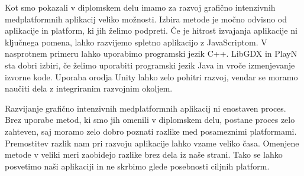 Kot smo pokazali v diplomskem delu imamo za razvoj grafično intenzivnih medplatformnih aplikacij veliko možnosti. Izbira metode je močno odvisno od aplikacije in platform, ki jih želimo podpreti. Če je hitrost izvajanja aplikacije ni ključnega pomena, lahko razvijemo spletno aplikacijo z JavaScriptom. V nasprotnem primeru lahko uporabimo programski jezik C++. LibGDX in PlayN sta dobri izbiri, če želimo uporabiti programski jezik Java in vroče izmenjevanje izvorne kode. Uporaba orodja Unity lahko zelo pohitri razvoj, vendar se moramo naučiti dela z integriranim razvojnim okoljem.

Razvijanje grafično intenzivnih medplatformnih aplikacij ni enostaven proces. Brez uporabe metod, ki smo jih omenili v diplomskem delu, postane proces zelo zahteven, saj moramo zelo dobro poznati razlike med posameznimi platformami. Premostitev razlik nam pri razvoju aplikacije lahko vzame veliko časa. Omenjene metode v veliki meri zaobidejo razlike brez dela iz naše strani. Tako se lahko posvetimo naši aplikaciji in ne skrbimo glede posebnosti ciljnih platform.